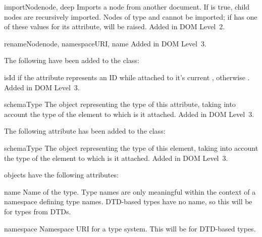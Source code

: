 \documentclass{howto}
\begin{document}
\begin{methoddesc}[Document]{importNode}{node, deep}
  Imports a node  from another document.  If  is
  true, child nodes are recursively imported.  Nodes of type
   and  cannot be
  imported; if  has one of these values for its
   attribute, 
  will be raised.
  Added in DOM Level~2.
\end{methoddesc}

\begin{methoddesc}[Document]{renameNode}{node, namespaceURI, name}
  Added in DOM Level~3.
\end{methoddesc}


The following have been added to the  class:

\begin{memberdesc}[Attr]{isId}
   if the attribute represents an ID while attached to it's
  current , otherwise .
  Added in DOM Level~3.
\end{memberdesc}

\begin{memberdesc}[Attr]{schemaType}
  The  object representing the type of this attribute,
  taking into account the type of the element to which is it attached.
  Added in DOM Level~3.
\end{memberdesc}

The following attribute has been added to the  class:

\begin{memberdesc}[Element]{schemaType}
  The  object representing the type of this element,
  taking into account the type of the element to which is it attached.
  Added in DOM Level~3.
\end{memberdesc}

 objects have the following attributes:

\begin{memberdesc}[TypeInfo]{name}
  Name of the type.  Type names are only meaningful within the context
  of a namespace defining type names.  DTD-based types have no name,
  so this will be  for types from DTDs.
\end{memberdesc}

\begin{memberdesc}[TypeInfo]{namespace}
  Namespace URI for a type system.  This will be  for
  DTD-based types.
\end{memberdesc}
\end{document}
